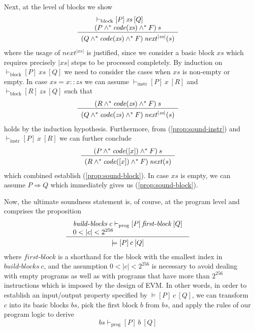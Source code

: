 \documentclass[sigplan,10pt,review]{acmart}\settopmatter{printfolios=true,printccs=false,printacmref=false}
\newcommand{\subpred}{\Rightarrow}
\newcommand{\sconj}{\wedge^*}
\newcommand{\tvalid}[3]{\models[#1]\:#2\:[#3]}
\newcommand{\ttrip}[5]{\mathit{#1} \vdash_{\mathrm{#2}}[#3]\:#4\:[#5]}
\newcommand{\xnext}{\mathit{next}}
\newcommand{\code}[1]{\mathit{code}(#1)}
\newcommand{\RuleC}[2]{\begin{array}{c}#1\\\hline\noalign{\smallskip}#2\end{array}}
\newcommand{\bblocks}{\mathit{build\mbox{-}blocks}}
\newcommand{\fblock}{\mathit{first\mbox{-}block}}
\newcommand{\len}[1]{|#1|}
\begin{document}
Next, at the level of blocks we show
\begin{equation}
\label{prop:sound-block}
\RuleC{\begin{array}{l}
         \ttrip{}{block}{P}{\mathit{xs}}{Q} \\
         (P \sconj \code{\mathit{xs}} \sconj F)\: s
       \end{array}}
 {(Q \sconj \code{\mathit{xs}} \sconj F)\: \xnext^{\len{\mathit{xs}}}(s)}
\end{equation}
where the usage of $\xnext^{\len{\mathit{xs}}}$ is justified, since we consider
a basic block $\mathit{xs}$ which requires precisely $\len{\mathit{xs}}$ steps
to be processed completely.   
%
By induction on $\ttrip{}{block}{P}{\mathit{xs}}{Q}$ we need to consider the cases
when $\mathit{xs}$ is non-empty or empty.
In case $\mathit{xs} = x::\mathit{zs}$ we can assume $\ttrip{}{instr}{P}{x}{R}$
and $\ttrip{}{block}{R}{\mathit{zs}}{Q}$ such that 
\[
\RuleC{(R \sconj \code{\mathit{zs}} \sconj F)\: s}
 {(Q \sconj \code{\mathit{zs}} \sconj F)\: \xnext^{\len{\mathit{zs}}}(s)}
\]
holds by the induction hypothesis. 
Furthermore, from (\ref{prop:sound-instr}) and $\ttrip{}{instr}{P}{x}{R}$ we can further conclude 
\[
\RuleC{(P \sconj \code{[x]} \sconj F)\: s}
      {(R \sconj \code{[x]} \sconj F)\: \xnext(s)}
\]
which combined establish (\ref{prop:sound-block}).
In case $\mathit{xs}$ is empty, we can assume $P \subpred Q$ which
immediately gives us (\ref{prop:sound-block}). 

Now, the ultimate soundness statement is, of course, at the program level and comprises the proposition
\begin{equation}
\label{prop:sound1}
\RuleC{\begin{array}{l}
       \ttrip{\bblocks\: c}{prog}{P}{\fblock}{Q} \\
       0 < \len{c} < 2^{256} 
       \end{array}}
{\tvalid{P}{c}{Q}}
\end{equation}
where $\fblock$ is a shorthand for the block with the smallest index in $\bblocks\: c$, and
the assumption $0 < \len{c} < 2^{256}$ is necessary to avoid dealing with empty programs
as well as with programs that have more than $2^{256}$ instructions which is imposed by 
the design of EVM. In other words, in order to establish an input/output property specified by 
$\tvalid{P}{c}{Q}$, we can transform $c$ into its basic blocks $\mathit{bs}$, 
pick the first block $b$ from $\mathit{bs}$, and
apply the rules of our program logic to derive 
\[
\ttrip{\mathit{bs}}{prog}{P}{b}{Q}
\]
\end{document}
